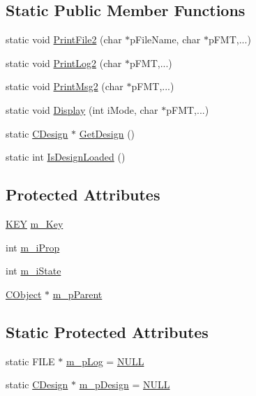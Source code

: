 \subsection*{Static Public Member Functions}
\begin{DoxyCompactItemize}
\item 
static void \mbox{\hyperlink{classCObject_a6894a565969879762f30ef73f70cbbc0}{Print\+File2}} (char $\ast$p\+File\+Name, char $\ast$p\+F\+MT,...)
\item 
static void \mbox{\hyperlink{classCObject_afbef6034e527bf408a93e1ee2d0675e0}{Print\+Log2}} (char $\ast$p\+F\+MT,...)
\item 
static void \mbox{\hyperlink{classCObject_ad03905456a69ab270896976b3dd69e05}{Print\+Msg2}} (char $\ast$p\+F\+MT,...)
\item 
static void \mbox{\hyperlink{classCObject_ade0e58d8dab14d912ec5465aecf74b10}{Display}} (int i\+Mode, char $\ast$p\+F\+MT,...)
\item 
static \mbox{\hyperlink{classCDesign}{C\+Design}} $\ast$ \mbox{\hyperlink{classCObject_a8a45a96cdd9a089b518c93fd29b50a7e}{Get\+Design}} ()
\item 
static int \mbox{\hyperlink{classCObject_af7d0080ca4135e9bbe9e92abfe9f904a}{Is\+Design\+Loaded}} ()
\end{DoxyCompactItemize}
\subsection*{Protected Attributes}
\begin{DoxyCompactItemize}
\item 
\mbox{\hyperlink{res2dmp_8cpp_a8ae9d53f33f46cfcfcb9736e6351452a}{K\+EY}} \mbox{\hyperlink{classCObject_ac0b3eb770527a6b1a964999b193023d1}{m\+\_\+\+Key}}
\item 
int \mbox{\hyperlink{classCObject_a6613f95f1c296f056907e6f64599cdc9}{m\+\_\+i\+Prop}}
\item 
int \mbox{\hyperlink{classCObject_a4574fff4aca175e5988c1fd2f8cb02a3}{m\+\_\+i\+State}}
\item 
\mbox{\hyperlink{classCObject}{C\+Object}} $\ast$ \mbox{\hyperlink{classCObject_abebf5132e588b7f64c93c510e719f0e7}{m\+\_\+p\+Parent}}
\end{DoxyCompactItemize}
\subsection*{Static Protected Attributes}
\begin{DoxyCompactItemize}
\item 
static F\+I\+LE $\ast$ \mbox{\hyperlink{classCObject_a631eaaa45d48157e9cb650e56e393218}{m\+\_\+p\+Log}} = \mbox{\hyperlink{BoxRouter_8h_a070d2ce7b6bb7e5c05602aa8c308d0c4}{N\+U\+LL}}
\item 
static \mbox{\hyperlink{classCDesign}{C\+Design}} $\ast$ \mbox{\hyperlink{classCObject_a8ad5af56e21ecd62bbcb9543a3eb88f1}{m\+\_\+p\+Design}} = \mbox{\hyperlink{BoxRouter_8h_a070d2ce7b6bb7e5c05602aa8c308d0c4}{N\+U\+LL}}
\end{DoxyCompactItemize}


